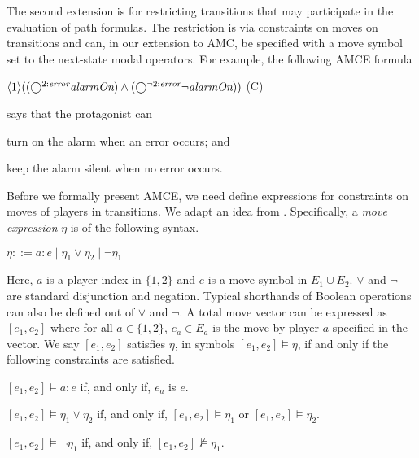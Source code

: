 The second extension is for restricting transitions that may participate 
in the evaluation of path formulas.  
The restriction is via constraints on moves on transitions and 
can, in our extension to AMC, be specified with a  
move symbol set to the next-state modal operators.  
For example, the following AMCE formula  
\begin{center} 
\hfill $\langle 1\rangle ((\bigcirc^{2:\textit{\scriptsize error}}\mbox{\em alarmOn}) 
\wedge (\bigcirc^{\neg 2:\textit{\scriptsize error}}\neg\mbox{\em alarmOn}))$ 
\hfill (C) 
\end{center} 
says that the protagonist can 
\begin{list1}
\item turn on the alarm when an error occurs; and 
\item keep the alarm silent when no error occurs.
\end{list1} 
Before we formally present AMCE, we need define expressions for 
constraints on moves of players in transitions.  
We adapt an idea from \cite{Wang14}.  
Specifically, a {\em move expression} $\eta$ is of the following syntax. 
\begin{center} 
$\eta ::= a:e \mid \eta_1\vee\eta_2 \mid \neg \eta_1$
\end{center} 
Here, $a$ is a player index in $\{1,2\}$ and $e$ is a move symbol in $E_1\cup E_2$.  
$\vee$ and $\neg$ are standard disjunction and negation.  
Typical shorthands of Boolean operations can also be defined out of 
$\vee$ and $\neg$.  
A total move vector can be expressed as $[e_1,e_2]$ 
where for all $a\in\{1,2\}$, $e_a\in E_a$ is the move by 
player $a$ specified in the vector.  
We say $[e_1,e_2]$ satisfies $\eta$, in symbols 
$[e_1,e_2]\models \eta$, if and only if the 
following constraints are satisfied. 
\begin{list1} 
\item $[e_1,e_2]\models a:e$ if, and only if, $e_a$ is $e$.  
\item $[e_1,e_2]\models \eta_1\vee\eta_2$ 
  if, and only if, $[e_1,e_2]\models \eta_1$ or 
  $[e_1,e_2]\models \eta_2$. 
\item $[e_1,e_2]\models \neg\eta_1$ 
  if, and only if, $[e_1,e_2]\not\models \eta_1$.   
\end{list1} 
